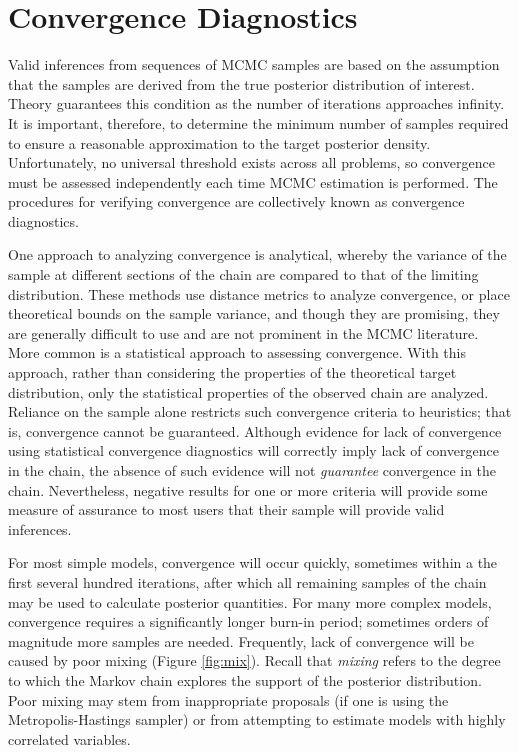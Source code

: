 \hypertarget{convergence}{}
\section{Convergence Diagnostics} %

Valid inferences from sequences of MCMC samples are based on the assumption that the samples are derived from the true posterior distribution of interest. Theory guarantees this condition as the number of iterations approaches infinity. It is important, therefore, to determine the minimum number of samples required to ensure a reasonable approximation to the target posterior density. Unfortunately, no universal threshold exists across all problems, so convergence must be assessed independently each time MCMC estimation is performed. The procedures for verifying convergence are collectively known as convergence diagnostics.

One approach to analyzing convergence is analytical, whereby the variance of the sample at different sections of the chain are compared to that of the limiting distribution. These methods use distance metrics to analyze convergence, or place theoretical bounds on the sample variance, and though they are promising, they are generally difficult to use and are not prominent in the MCMC literature. More common is a statistical approach to assessing convergence. With this approach, rather than considering the properties of the theoretical target distribution, only the statistical properties of the observed chain are analyzed. Reliance on the sample alone restricts such convergence criteria to heuristics; that is, convergence cannot be guaranteed. Although evidence for lack of convergence using statistical convergence diagnostics will correctly imply lack of convergence in the chain, the absence of such evidence will not \emph{guarantee} convergence in the chain. Nevertheless, negative results for one or more criteria will provide some measure of assurance to most users that their sample will provide valid inferences.

For most simple models, convergence will occur quickly, sometimes within a the first several hundred iterations, after which all remaining samples of the chain may be used to calculate posterior quantities. For many more complex models, convergence requires a significantly longer burn-in period; sometimes  orders of magnitude more samples are needed. Frequently, lack of convergence will be caused by poor mixing (Figure \ref{fig:mix}). Recall that \emph{mixing} refers to the degree to which the Markov chain explores the support of the posterior distribution. Poor mixing may stem from inappropriate proposals (if one is using the Metropolis-Hastings sampler) or from attempting to estimate models with highly correlated variables.

